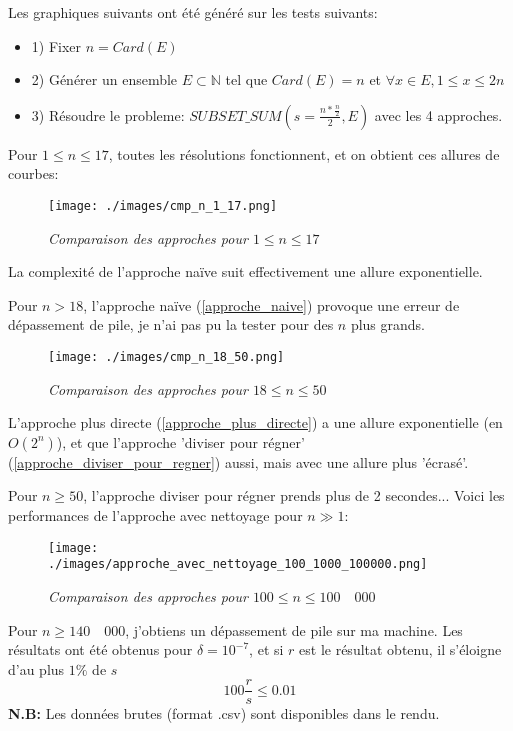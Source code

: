 \documentclass[10pt]{article}
\begin{document}
				Les graphiques suivants ont été généré sur les tests suivants:
				\begin{itemize}[label=-]
					\setlength\itemsep{0.1em}
					\item 1) Fixer $n = Card(E)$
					\item 2) Générer un ensemble $E \subset \mathbb{N}$ tel que $Card(E) = n$ et $\forall x \in E, 1 \leq x \leq 2n$
					\item 3) Résoudre le probleme: $SUBSET\_SUM(s = \frac{n * \frac{n}{2}}{2}, E)$ avec les 4 approches.
				\end{itemize}
				
				Pour $1 \leq n \leq 17$, toutes les résolutions fonctionnent, et on obtient ces allures de courbes:
				
				\begin{figure}[H]
					\texttt{[image: ./images/cmp\_n\_1\_17.png]}
					\caption{\textit{Comparaison des approches pour $1 \leq n \leq 17$}}
				\end{figure}
				La complexité de l'approche naïve suit effectivement une allure exponentielle.
				
				\newpage
				Pour $n > 18$, l'approche naïve (\ref{approche_naive}) provoque une erreur de dépassement de pile, je n'ai pas pu
				la tester pour des $n$ plus grands.
				\begin{figure}[H]
					\texttt{[image: ./images/cmp\_n\_18\_50.png]}
					\caption{\textit{Comparaison des approches pour $18 \leq n \leq 50$}}
				\end{figure}
				L'approche plus directe (\ref{approche_plus_directe}) a une allure exponentielle (en $O(2^n)$),
				et que l'approche 'diviser pour régner' (\ref{approche_diviser_pour_regner}) aussi, mais avec une allure plus 'écrasé'.
				
				\newpage
				Pour $n \geq 50$, l'approche diviser pour régner prends plus de 2 secondes... Voici les performances de l'approche avec nettoyage
				pour $n \gg 1$:
				\begin{figure}[H]
					\texttt{[image: ./images/approche\_avec\_nettoyage\_100\_1000\_100000.png]}
					\caption{\textit{Comparaison des approches pour $100 \leq n \leq 100\quad000$}}
				\end{figure}
				Pour $n \geq 140\quad000$, j'obtiens un dépassement de pile sur ma machine.
				\newline
				Les résultats ont été obtenus pour $\delta = 10^{-7}$, et si $r$ est le résultat obtenu,
				il s'éloigne d'au plus $1\%$ de $s$ $$100 \frac{r}{s} \leq 0.01$$
				\newline
				\newline
				\textbf{N.B:} Les données brutes (format .csv) sont disponibles dans le rendu.
		\newpage
\end{document}
